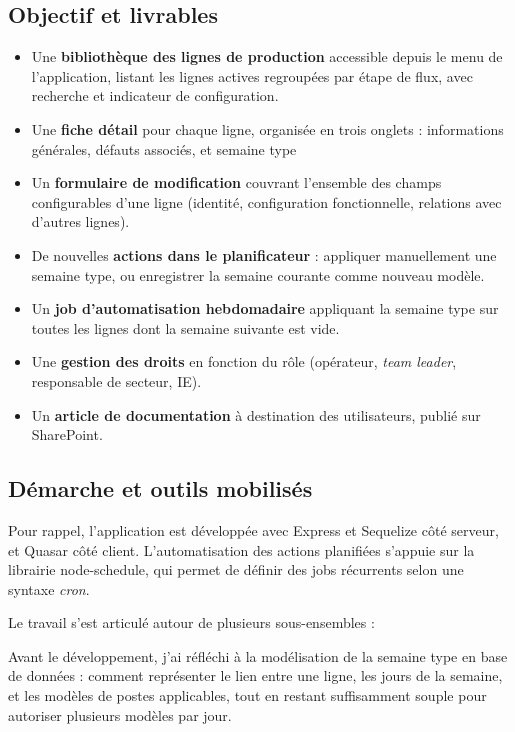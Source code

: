 \documentclass[pe1a]{tnreport} %
\begin{document}
\subsection{Objectif et livrables}
\begin{itemize}
    \item Une \textbf{bibliothèque des lignes de production} accessible 
    depuis le menu de l'application, listant les lignes actives regroupées 
    par étape de flux, avec recherche et indicateur de configuration.
    \item Une \textbf{fiche détail} pour chaque ligne, organisée en trois 
    onglets : informations générales, défauts associés, et semaine type
    \item Un \textbf{formulaire de modification} couvrant l'ensemble des 
    champs configurables d'une ligne (identité, configuration 
    fonctionnelle, relations avec d'autres lignes).
    \item De nouvelles \textbf{actions dans le planificateur} : appliquer 
    manuellement une semaine type, ou enregistrer la semaine courante 
    comme nouveau modèle.
    \item Un \textbf{job d'automatisation hebdomadaire} appliquant la 
    semaine type sur toutes les lignes dont la semaine suivante est vide.
    \item Une \textbf{gestion des droits} en fonction du rôle 
    (opérateur, \textit{team leader}, responsable de secteur, \gls{IE}).
    \item Un \textbf{article de documentation} à destination des 
    utilisateurs, publié sur SharePoint.
\end{itemize}

\subsection{Démarche et outils mobilisés}
Pour rappel, l'application est développée avec Express et \gls{Sequelize}
côté serveur, et \gls{Quasar} côté client. L'automatisation des
actions planifiées s'appuie sur la librairie node-schedule, qui permet de définir 
des jobs récurrents selon une syntaxe \textit{\gls{cron}}.

Le travail s'est articulé autour de plusieurs sous-ensembles :

Avant le développement, j'ai réfléchi à la modélisation de la semaine 
type en base de données : comment représenter le lien entre une ligne, 
les jours de la semaine, et les modèles de postes applicables, tout en 
restant suffisamment souple pour autoriser plusieurs modèles par jour.
\end{document}
